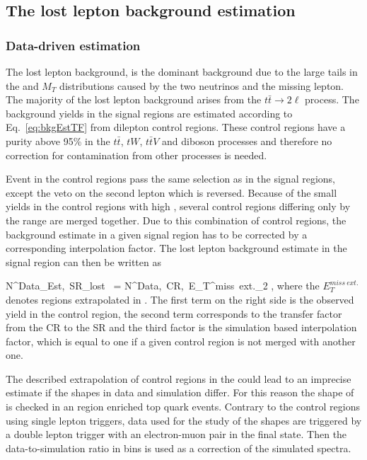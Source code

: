 \newpage
\subsection{The lost lepton background estimation}

\subsubsection{Data-driven estimation}

The lost lepton background,  is the dominant background due to the large tails in the \MET and $M_{T}$ distributions caused by the two neutrinos and the missing lepton. The majority of the lost lepton background arises from the $t\bar{t} \to 2\ell$ process. The background yields in the signal regions are estimated according to Eq.~\ref{eq:bkgEstTF} from dilepton control regions. These control regions have a purity above 95\% in the $t\bar{t}$, $tW$, $t\bar{t}V$ and diboson processes and therefore no correction for contamination from other processes is needed. 

Event in the control regions pass the same selection as in the signal regions, except the veto on the second lepton which is reversed. Because of the small yields in the control regions with high \MET, several control regions differing only by the \MET range are merged together. Due to this combination of control regions, the background estimate in a given signal region has to be corrected by a corresponding interpolation factor. The lost lepton background estimate in the signal region can then be written as

{
N^{Data_{Est},~SR}_{lost~\ell}  =  N^{Data,~CR,~E_{T}^{miss}~ext.}_{2\ell} \times  {} \times {},
}
where the $E_{T}^{miss~ext.}$ denotes regions extrapolated in \MET. The first term on the right side is the observed yield in the control region, the second term corresponds to the transfer factor from the CR to the SR  and the third factor is the simulation based \MET interpolation factor, which is equal to one if a given control region is not merged with another one.

The described extrapolation of control regions in the \MET could lead to an imprecise estimate if the \MET shapes in data and simulation differ. For this reason the shape of \MET is checked in an region enriched top quark events. Contrary to the control regions using single lepton triggers, data used for the study of the \MET shapes are triggered by a  double lepton trigger with an electron-muon pair in the final state. Then the data-to-simulation ratio in \MET bins is used as a correction of the simulated \MET spectra. 

